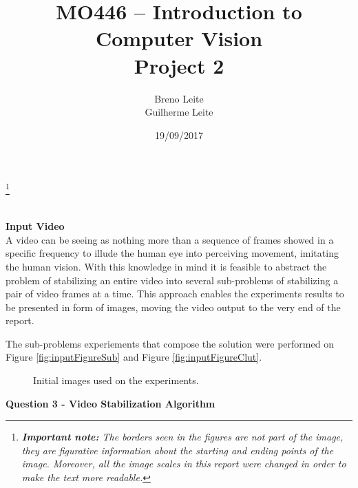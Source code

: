 \documentclass[12pt,a4paper]{article}
\title{MO446 -- Introduction to Computer Vision  \\ Project 2}
\author{Breno Leite  \\ Guilherme Leite}
\date{19/09/2017}
\newcommand\blfootnote[1]{%
	\begingroup
	\renewcommand\thefootnote{}\footnote{#1}%
	\addtocounter{footnote}{-1}%
	\endgroup
}
\begin{document}
\maketitle
\blfootnote{\textit{\textbf{Important note:} The borders seen in the figures are not part of the image, they are figurative information about the starting and ending points of the image. Moreover, all the image scales in this report were changed in order to make the text more readable.}} \\


\textbf{\LARGE Input Video}\\

	A video can be seeing as nothing more than a sequence of frames showed in a specific frequency to illude the human eye into perceiving movement, imitating the human vision. With this knowledge in mind it is feasible to abstract the problem of stabilizing an entire video into several sub-problems of stabilizing a pair of video frames at a time. This approach enables the experiments results to be presented in form of images, moving the video output to the very end of the report.
\par
	The sub-problems experiements that compose the solution were performed on Figure \ref{fig:inputFigureSub} and Figure \ref{fig:inputFigureClut}.

\begin{figure}[!h]
	\centering
	\quad
	\caption{Initial images used on the experiments.}
	\label{fig:inputFigure}
\end{figure}

\textbf{\LARGE Question 3 - Video Stabilization Algorithm}\\
\end{document}
